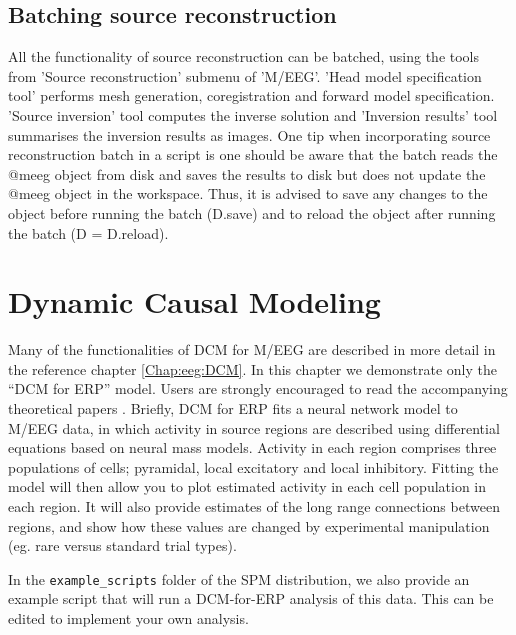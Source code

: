 \subsection{Batching source reconstruction}
All the functionality of source reconstruction can be batched, using the tools from 'Source reconstruction' submenu of 'M/EEG'. 'Head model specification tool' performs mesh generation, coregistration and forward model specification. 'Source inversion' tool computes the inverse solution and 'Inversion results' tool summarises the inversion results as images. One tip when incorporating source reconstruction batch in a script is one should be aware that the batch reads the @meeg object from disk and saves the results to disk but does not update the @meeg object in the workspace. Thus, it is advised to save any changes to the object before running the batch (D.save) and to reload the object after running the batch (D = D.reload).

\section{Dynamic Causal Modeling}

Many of the functionalities of DCM for M/EEG are described in more detail in the reference chapter \ref{Chap:eeg:DCM}. In this chapter we demonstrate only the ``DCM for ERP'' model.
Users are strongly encouraged to read the accompanying theoretical papers \cite{od_dcm_erp,sjk_dcm_erp}. Briefly, DCM for ERP fits a  neural network model to M/EEG data, in which activity in source regions are described using differential equations based on neural mass models. Activity in each region comprises three populations of cells; pyramidal, local excitatory and local inhibitory. Fitting the model will then allow you to plot estimated activity in each cell population in each region. It will also provide estimates of the long range connections between regions, and show how these values are changed by experimental manipulation (eg. rare versus standard trial types).

In the \texttt{example\_scripts} folder of the SPM distribution, we also provide an example script that will run a DCM-for-ERP analysis of this data. This can be edited to implement your own analysis.

